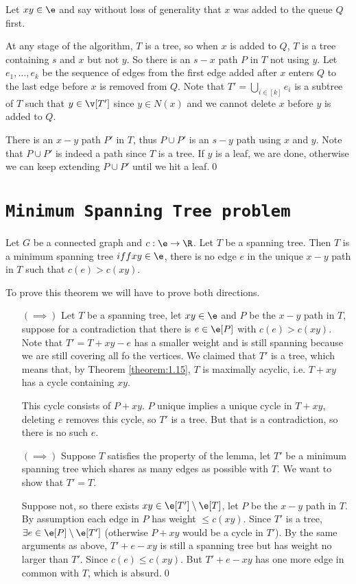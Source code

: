 \begin{prf}
    Let $xy \in \e$ and say without loss of generality that $x$ was added to the queue $Q$ first.

    At any stage of the algorithm, $T$ is a tree, so when $x$ is added to $Q$, $T$ is a tree containing $s$ and $x$ but not $y$. So there is an $s - x$ path $P$ in $T$ not using $y$. Let $e_1, \dots, e_k$ be the sequence of edges from the first edge added after $x$ enters $Q$ to the last edge before $x$ is removed from $Q$. Note that $T' = \bigcup_{i \in [k]}e_i$ is a subtree of $T$ such that $y \in \v[T']$ since $y \in N(x)$ and we cannot delete $x$ before $y$ is added to $Q$.

    There is an $x - y$ path $P'$ in $T$, thus $P \cup P'$ is an $s - y$ path using $x$ and $y$. Note that $P \cup P'$ is indeed a path since $T$ is a tree. If $y$ is a leaf, we are done, otherwise we can keep extending $P \cup P'$ until we hit a leaf.\qed
\end{prf}
\section{\texttt{Minimum Spanning Tree problem}}
\begin{customlemma}{1.22}
    \label{lemma:1.22}
    Let $G$ be a connected graph and $c: \e \rightarrow \R$. Let $T$ be a spanning tree. Then $T$ is a minimum spanning tree $iff xy \in \e$, there is no edge $e$ in the unique $x - y$ path in $T$ such that $c(e) > c(xy)$. 
\end{customlemma}
\begin{prf}
    To prove this theorem we will have to prove both directions.
    \begin{itemize}
        \item[$(\implies)$] Let $T$ be a spanning tree, let $xy \in \e$ and $P$ be the $x - y$ path in $T$, suppose for a contradiction that there is $e \in \e[P]$ with $c(e) > c(xy)$. Note that $T' = T + xy - e$ has a smaller weight and is still spanning because we are still covering all fo the vertices. We claimed that $T'$ is a tree, which means that, by Theorem \ref{theorem:1.15}, $T$ is maximally acyclic, i.e. $T + xy$ has a cycle containing $xy$.

        This cycle consists of $P + xy$. $P$ unique implies a unique cycle in $T + xy$, deleting $e$ removes this cycle, so $T'$ is a tree. But that is a contradiction, so there is no such $e$.
        \item[$(\implies)$] Suppose $T$ satisfies the property of the lemma, let $T'$ be a minimum spanning tree which shares as many edges as possible with $T$. We want to show that $T' = T$.
        
        Suppose not, so there exists $xy \in \e[T']\setminus\e[T]$, let $P$ be the $x - y$ path in $T$. By assumption each edge in $P$ has weight $\leq c(xy)$. Since $T'$ is a tree, $\exists e \in \e[P] \setminus \e[T']$ (otherwise $P + xy$ would be a cycle in $T'$). By the same arguments as above, $T' + e - xy$ is still a spanning tree but has weight no larger than $T'$. Since $c(e) \leq c(xy)$. But $T' + e - xy$ has one more edge in common with $T$, which is absurd.\qed
    \end{itemize}
\end{prf}

